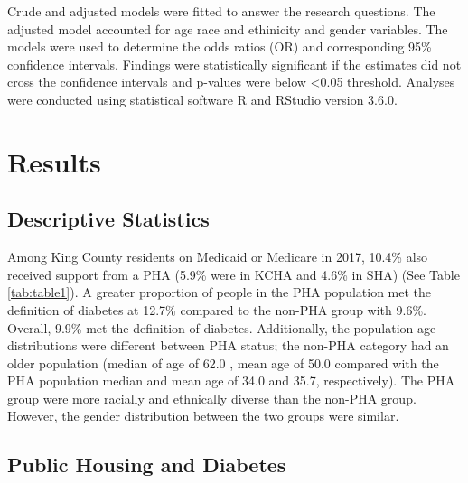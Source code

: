 \documentclass [11pt, proquest] {uwthesis}[2015/03/03]
\begin{document}
Crude and adjusted models were fitted to answer the research questions.
The adjusted model accounted for age race and ethinicity and gender
variables. The models were used to determine the odds ratios (OR) and
corresponding 95\% confidence intervals. Findings were statistically
significant if the estimates did not cross the confidence intervals and
p-values were below \textless{}0.05 threshold. Analyses were conducted
using statistical software R and RStudio version 3.6.0.

\chapter{Results}\label{ref-labels}

\section{Descriptive Statistics}\label{descriptive-statistics}

Among King County residents on Medicaid or Medicare in 2017, 10.4\% also
received support from a PHA (5.9\% were in KCHA and 4.6\% in SHA) (See
Table \ref{tab:table1}). A greater proportion of people in the PHA
population met the definition of diabetes at 12.7\% compared to the
non-PHA group with 9.6\%. Overall, 9.9\% met the definition of diabetes.
Additionally, the population age distributions were different between
PHA status; the non-PHA category had an older population (median of age
of 62.0 , mean age of 50.0 compared with the PHA population median and
mean age of 34.0 and 35.7, respectively). The PHA group were more
racially and ethnically diverse than the non-PHA group. However, the
gender distribution between the two groups were similar.

\section{Public Housing and Diabetes}\label{public-housing-and-diabetes}
\end{document}
